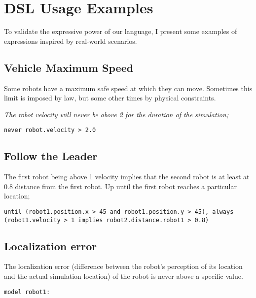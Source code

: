 \section{DSL Usage Examples}
\label{sec:languageexamples}
To validate the expressive power of our language, I present some examples of expressions inspired by real-world scenarios.


\subsection{Vehicle Maximum Speed}
\label{sec:speedexample}

Some robots have a maximum safe speed at which they can move. Sometimes this limit is imposed by law, but some other times by physical constraints.

\textit{The robot velocity will never be above 2 for the duration of the simulation;}

\texttt{never robot.velocity > 2.0}


\subsection{Follow the Leader}
\label{ssec:followexample}

The first robot being above 1 velocity implies that the second robot is at least at 0.8 distance from the first robot. Up until the first robot reaches a particular location;

\texttt{until (robot1.position.x > 45 and robot1.position.y > 45), always (robot1.velocity > 1 implies robot2.distance.robot1 > 0.8)}


\subsection{Localization error}
\label{ssec:localizationexample}

The localization error (difference between the robot's perception of its location and the actual simulation location) of the robot is never above a specific value.

\texttt{model robot1:}

